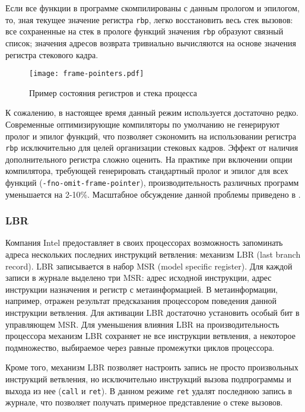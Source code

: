 Если все функции в программе скомпилированы с данным прологом и эпилогом,
то, зная текущее значение регистра \verb!rbp!, легко восстановить весь стек вызовов: все сохраненные на стек в прологе функций
значения \verb!rbp! образуют связный список; значения адресов возврата тривиально вычисляются на основе значения регистра стекового кадра.

\begin{figure}[H]
    \centering
    \texttt{[image: frame-pointers.pdf]}
    \caption{Пример состояния регистров и стека процесса}
    \label{fig:fp}
\end{figure}

К сожалению, в настоящее время данный режим используется достаточно редко.
Современные оптимизирующие компиляторы по умолчанию не генерируют пролог и эпилог функций,
что позволяет сэкономить на использовании регистра \verb!rbp! исключительно для целей организации стековых кадров.
Эффект от наличия дополнительного регистра сложно оценить.
На практике при включении опции компилятора, требующей генерировать стандартный пролог и эпилог для всех функций
(\verb!-fno-omit-frame-pointer!), производительность различных программ уменьшается на 2-10\%.
Масштабное обсуждение данной проблемы приведено в \cite{fp:fedora}.

\subsubsection{LBR}
Компания Intel предоставляет в своих процессорах возможность запоминать адреса нескольких последних инструкций ветвления:
механизм LBR (last branch record). LBR записывается в набор MSR (model specific register).
Для каждой записи в журнале выделено три MSR: адрес исходной инструкции, адрес инструкции назначения и регистр с метаинформацией.
В метаинформации, например, отражен результат предсказания процессором поведения данной инструкции ветвления.
Для активации LBR достаточно установить особый бит в управляющем MSR.
Для уменьшения влияния LBR на производительность процессора механизм LBR сохраняет не все инструкции ветвления, а некоторое подмножество,
выбираемое через равные промежутки циклов процессора.

Кроме того, механизм LBR позволяет настроить запись не просто произвольных инструкций ветвления, но исключительно инструкций
вызова подпрограммы и выхода из нее (\verb!call! и \verb!ret!).
В данном режиме \verb!ret! удалят последнюю запись в журнале, что позволяет получать примерное представление о стеке вызовов.

